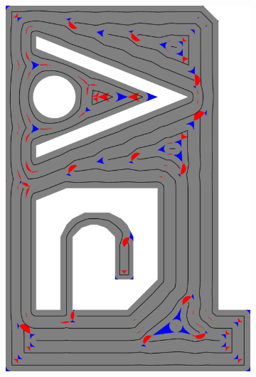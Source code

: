 \begin{figure}
\begin{subfigure}{\figwidth}
\includegraphics[height=\figheight]{sources/validation/gMAT_example/TEST_Distributed_accuracy.png}

\end{subfigure}
\end{figure}
